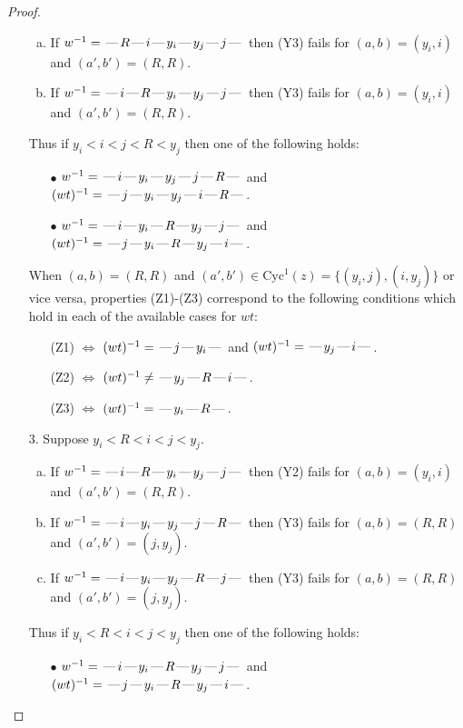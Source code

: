 \documentclass[10pt]{article}
\theoremstyle{definition}
\theoremstyle{definition}
\def\dash{\text{\hspace{0.5mm}---\hspace{0.5mm}}}
\def\Cyc{\mathrm{Cyc}}
\begin{document}
\begin{proof}
\begin{enumerate}
\begin{enumerate}[(a)]
\item If $w^{-1} = \dash R\dash i\dash y_i\dash y_j\dash j\dash $ then (Y3) fails for $(a,b)=(y_i,i)$ and $(a',b')=(R,R)$.
\item If $w^{-1} = \dash i\dash R\dash y_i\dash y_j\dash j\dash $ then (Y3) fails for $(a,b)=(y_i,i)$ and $(a',b')=(R,R)$.
\end{enumerate}
Thus if $y_i < i < j < R < y_j$ then one of the following holds:
\begin{enumerate}
\item[$\bullet$] $w^{-1} = \dash i\dash y_i\dash y_j\dash j\dash R\dash $ and $(wt)^{-1} = \dash j\dash y_i\dash y_j\dash i\dash R\dash $.
\item[$\bullet$] $w^{-1} = \dash i\dash y_i\dash R\dash y_j\dash j\dash $ and $(wt)^{-1} = \dash j\dash y_i\dash R\dash y_j\dash i\dash $.
\end{enumerate}
When $(a,b)= (R,R)$ and $(a',b')\in \Cyc^1(z)=\{(y_i,j),(i,y_j)\}$ or vice versa,
properties (Z1)-(Z3) correspond to the following conditions which
hold in each of the available cases for $wt$:
\begin{enumerate}
\item[](Z1) $\Leftrightarrow$ $(wt)^{-1} = \dash j \dash y_i \dash$  and $(wt)^{-1} = \dash y_j \dash i \dash$.
\item[](Z2) $\Leftrightarrow$ $(wt)^{-1} \neq \dash y_j \dash R \dash i \dash$.
\item[](Z3) $\Leftrightarrow$ $(wt)^{-1} = \dash y_i \dash R \dash$.
\end{enumerate}
\item[$3$.] Suppose $y_i < R < i < j < y_j$.
\begin{enumerate}[(a)]
\item If $w^{-1} = \dash i\dash R\dash y_i\dash y_j\dash j\dash $ then (Y2) fails for $(a,b)=(y_i,i)$ and $(a',b')=(R,R)$.
\item If $w^{-1} = \dash i\dash y_i\dash y_j\dash j\dash R\dash $ then (Y3) fails for $(a,b)=(R,R)$ and $(a',b')=(j,y_j)$.
\item If $w^{-1} = \dash i\dash y_i\dash y_j\dash R\dash j\dash $ then (Y3) fails for $(a,b)=(R,R)$ and $(a',b')=(j,y_j)$.
\end{enumerate}
Thus if $y_i < R < i < j < y_j$ then one of the following holds:
\begin{enumerate}
\item[$\bullet$] $w^{-1} = \dash i\dash y_i\dash R\dash y_j\dash j\dash $ and $(wt)^{-1} = \dash j\dash y_i\dash R\dash y_j\dash i\dash $.

\end{enumerate}
\end{enumerate}
\end{proof}
\end{document}
